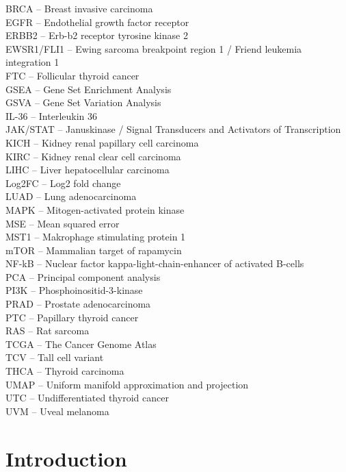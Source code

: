 \documentclass[
  11pt,
  parskip,
  oneside]{scrreprt}
\begin{document}
BRCA -- Breast invasive carcinoma\\
EGFR -- Endothelial growth factor receptor\\
ERBB2 -- Erb-b2 receptor tyrosine kinase 2\\
EWSR1/FLI1 -- Ewing sarcoma breakpoint region 1 / Friend leukemia
integration 1\\
FTC -- Follicular thyroid cancer\\
GSEA -- Gene Set Enrichment Analysis\\
GSVA -- Gene Set Variation Analysis\\
IL-36 -- Interleukin 36\\
JAK/STAT -- Januskinase / Signal Transducers and Activators of
Transcription\\
KICH -- Kidney renal papillary cell carcinoma\\
KIRC -- Kidney renal clear cell carcinoma\\
LIHC -- Liver hepatocellular carcinoma\\
Log2FC -- Log2 fold change\\
LUAD -- Lung adenocarcinoma\\
MAPK -- Mitogen-activated protein kinase\\
MSE -- Mean squared error\\
MST1 -- Makrophage stimulating protein 1\\
mTOR -- Mammalian target of rapamycin\\
NF-kB -- Nuclear factor kappa-light-chain-enhancer of activated
B-cells\\
PCA -- Principal component analysis\\
PI3K -- Phosphoinositid-3-kinase\\
PRAD -- Prostate adenocarcinoma\\
PTC -- Papillary thyroid cancer\\
RAS -- Rat sarcoma\\
TCGA -- The Cancer Genome Atlas\\
TCV -- Tall cell variant\\
THCA -- Thyroid carcinoma\\
UMAP -- Uniform manifold approximation and projection\\
UTC -- Undifferentiated thyroid cancer\\
UVM -- Uveal melanoma \clearpage

\tableofcontents
\clearpage

\hypertarget{introduction}{%
\chapter{Introduction}\label{introduction}}
\end{document}
